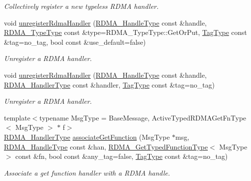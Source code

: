 \begin{DoxyCompactItemize}
\begin{DoxyCompactList}\small\item\em Collectively register a new typeless R\+D\+MA handler. \end{DoxyCompactList}\item 
void \hyperlink{structvt_1_1rdma_1_1_r_d_m_a_manager_a59de11a7b7a8034a2e8e27a10897ce01}{unregister\+Rdma\+Handler} (\hyperlink{namespacevt_a10442579ec4e7ebef223818e64bcf908}{R\+D\+M\+A\+\_\+\+Handle\+Type} const \&handle, \hyperlink{namespacevt_1_1rdma_ac848e1d9da43db6294bd06f83e5d3946}{R\+D\+M\+A\+\_\+\+Type\+Type} const \&type=R\+D\+M\+A\+\_\+\+Type\+Type\+::\+Get\+Or\+Put, \hyperlink{namespacevt_a84ab281dae04a52a4b243d6bf62d0e52}{Tag\+Type} const \&tag=no\+\_\+tag, bool const \&use\+\_\+default=false)
\begin{DoxyCompactList}\small\item\em Unregister a R\+D\+MA handler. \end{DoxyCompactList}\item 
void \hyperlink{structvt_1_1rdma_1_1_r_d_m_a_manager_a34e50e7536bddd880c97b60b276b63ad}{unregister\+Rdma\+Handler} (\hyperlink{namespacevt_a10442579ec4e7ebef223818e64bcf908}{R\+D\+M\+A\+\_\+\+Handle\+Type} const \&handle, \hyperlink{namespacevt_a9530efb893c0f3846e8ac5f0507e0f49}{R\+D\+M\+A\+\_\+\+Handler\+Type} const \&handler, \hyperlink{namespacevt_a84ab281dae04a52a4b243d6bf62d0e52}{Tag\+Type} const \&tag=no\+\_\+tag)
\begin{DoxyCompactList}\small\item\em Unregister a R\+D\+MA handler. \end{DoxyCompactList}\item 
{\footnotesize template$<$typename Msg\+Type  = Base\+Message, Active\+Typed\+R\+D\+M\+A\+Get\+Fn\+Type$<$ Msg\+Type $>$ $\ast$ f$>$ }\\\hyperlink{namespacevt_a9530efb893c0f3846e8ac5f0507e0f49}{R\+D\+M\+A\+\_\+\+Handler\+Type} \hyperlink{structvt_1_1rdma_1_1_r_d_m_a_manager_abcddc1a18794163032758fcf035ff406}{associate\+Get\+Function} (Msg\+Type $\ast$msg, \hyperlink{namespacevt_a10442579ec4e7ebef223818e64bcf908}{R\+D\+M\+A\+\_\+\+Handle\+Type} const \&han, \hyperlink{structvt_1_1rdma_1_1_r_d_m_a_manager_a0d865535d118fe9dcab074fd3df74ce1}{R\+D\+M\+A\+\_\+\+Get\+Typed\+Function\+Type}$<$ Msg\+Type $>$ const \&fn, bool const \&any\+\_\+tag=false, \hyperlink{namespacevt_a84ab281dae04a52a4b243d6bf62d0e52}{Tag\+Type} const \&tag=no\+\_\+tag)
\begin{DoxyCompactList}\small\item\em Associate a get function handler with a R\+D\+MA handle. \end{DoxyCompactList}\item 

\end{DoxyCompactItemize}
